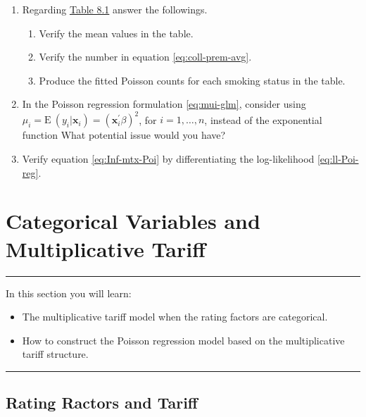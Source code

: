 \documentclass[]{book}
\theoremstyle{definition}
\theoremstyle{definition}
\theoremstyle{definition}
\theoremstyle{remark}
\begin{document}
\begin{enumerate}
\def\labelenumi{\arabic{enumi}.}
\item
  Regarding \protect\hyperlink{tab:8.1}{Table 8.1} answer the
  followings.

  \begin{enumerate}
  \def\labelenumii{(\alph{enumii})}
  \item
    Verify the mean values in the table.
  \item
    Verify the number in equation \eqref{eq:coll-prem-avg}.
  \item
    Produce the fitted Poisson counts for each smoking status in the
    table.
  \end{enumerate}
\item
  In the Poisson regression formulation \eqref{eq:mui-glm}, consider using
  \(\mu_i=\mathrm{E~}{(y_i|\mathbf{ x}_i)}=({\mathbf{ x}^{\prime}_i\beta})^2\),
  for \(i=1, \ldots, n\), instead of the exponential function What
  potential issue would you have?
\item
  Verify equation \eqref{eq:Inf-mtx-Poi} by differentiating the
  log-likelihood \eqref{eq:ll-Poi-reg}.
\end{enumerate}

\section{Categorical Variables and Multiplicative
Tariff}\label{S:CatVarMultiTarriff}

\begin{center}\rule{0.5\linewidth}{\linethickness}\end{center}

In this section you will learn:

\begin{itemize}
\item
  The multiplicative tariff model when the rating factors are
  categorical.
\item
  How to construct the Poisson regression model based on the
  multiplicative tariff structure.
\end{itemize}

\begin{center}\rule{0.5\linewidth}{\linethickness}\end{center}

\subsection{Rating Ractors and Tariff}\label{rating-ractors-and-tariff}
\end{document}
